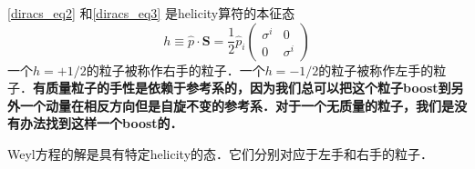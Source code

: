 \autoref{diracs_eq2} 和\autoref{diracs_eq3} 是helicity算符的本征态
\begin{equation}
h\equiv\hat p \cdot \mathbf S = \frac{1}{2} \hat p_i \begin{pmatrix}
\sigma^i & 0 \\
 0 & \sigma^i
\end{pmatrix}
\end{equation}
一个$h=+1/2$的粒子被称作右手的粒子．一个$h=-1/2$的粒子被称作左手的粒子．\textbf{有质量粒子的手性是依赖于参考系的，因为我们总可以把这个粒子boost到另外一个动量在相反方向但是自旋不变的参考系．对于一个无质量的粒子，我们是没有办法找到这样一个boost的．}

Weyl方程的解是具有特定helicity的态．它们分别对应于左手和右手的粒子．




